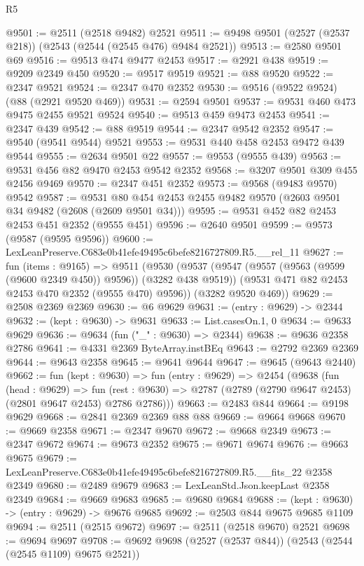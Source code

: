 \begin{lexlean}{R5}
\begin{coremodule}
@9501 := @2511 (@2518 @9482) @2521
@9511 := @9498 @9501 (@2527 (@2537 @218)) (@2543 (@2544 (@2545 @476) @9484 @2521))
@9513 := @2580 @9501 @69
@9516 := @9513 @474 @9477 @2453
@9517 := @2921 @438
@9519 := @9209 @2349 @450
@9520 := @9517 @9519
@9521 := @88 @9520
@9522 := @2347 @9521
@9524 := @2347 @470 @2352
@9530 := @9516 (@9522 @9524) (@88 (@2921 @9520 @469))
@9531 := @2594 @9501
@9537 := @9531 @460 @473 @9475 @2455 @9521 @9524
@9540 := @9513 @459 @9473 @2453
@9541 := @2347 @439
@9542 := @88 @9519
@9544 := @2347 @9542 @2352
@9547 := @9540 (@9541 @9544) @9521
@9553 := @9531 @440 @458 @2453 @9472 @439 @9544
@9555 := @2634 @9501 @22
@9557 := @9553 (@9555 @439)
@9563 := @9531 @456 @82 @9470 @2453 @9542 @2352
@9568 := @3207 @9501 @309 @455 @2456 @9469
@9570 := @2347 @451 @2352
@9573 := @9568 (@9483 @9570) @9542
@9587 := @9531 @80 @454 @2453 @2455 @9482 @9570 (@2603 @9501 @34 @9482 (@2608 (@2609 @9501 @34)))
@9595 := @9531 @452 @82 @2453 @2453 @451 @2352 (@9555 @451)
@9596 := @2640 @9501
@9599 := @9573 (@9587 (@9595 @9596))
@9600 := LexLeanPreserve.C683e0b41efe49495c6befe8216727809.R5.__rel_11
@9627 := fun (items : @9165) =>
  @9511
    (@9530
      (@9537
        (@9547 (@9557 (@9563 (@9599 (@9600 @2349 @450)) @9596)) (@3282 @438 @9519))
        (@9531 @471 @82 @2453 @2453 @470 @2352 (@9555 @470) @9596))
      (@3282 @9520 @469))
@9629 := @2508 @2369 @2369
@9630 := @6 @9629
@9631 := (entry : @9629) -> @2344
@9632 := (kept : @9630) -> @9631
@9633 := List.casesOn.{1, 0}
@9634 := @9633 @9629
@9636 := @9634 (fun ("_" : @9630) => @2344)
@9638 := @9636 @2358 @2786
@9641 := @4331 @2369 ByteArray.instBEq
@9643 := @2792 @2369 @2369
@9644 := @9643 @2358
@9645 := @9641 @9644
@9647 := @9645 (@9643 @2440)
@9662 := fun (kept : @9630) =>
  fun (entry : @9629) =>
  @2454
    (@9638
      (fun (head : @9629) =>
      fun (rest : @9630) => @2787 (@2789 (@2790 @9647 @2453) (@2801 @9647 @2453) @2786 @2786)))
@9663 := @2483 @844
@9664 := @9198 @9629
@9668 := @2841 @2369 @2369 @88 @88
@9669 := @9664 @9668
@9670 := @9669 @2358
@9671 := @2347 @9670
@9672 := @9668 @2349
@9673 := @2347 @9672
@9674 := @9673 @2352
@9675 := @9671 @9674
@9676 := @9663 @9675
@9679 := LexLeanPreserve.C683e0b41efe49495c6befe8216727809.R5.__fits_22 @2358 @2349
@9680 := @2489 @9679
@9683 := LexLeanStd.Json.keepLast @2358 @2349
@9684 := @9669 @9683
@9685 := @9680 @9684
@9688 := (kept : @9630) -> (entry : @9629) -> @9676 @9685
@9692 := @2503 @844 @9675 @9685 @1109
@9694 := @2511 (@2515 @9672)
@9697 := @2511 (@2518 @9670) @2521
@9698 := @9694 @9697
@9708 := @9692 @9698 (@2527 (@2537 @844)) (@2543 (@2544 (@2545 @1109) @9675 @2521))

\end{coremodule}
\end{lexlean}
